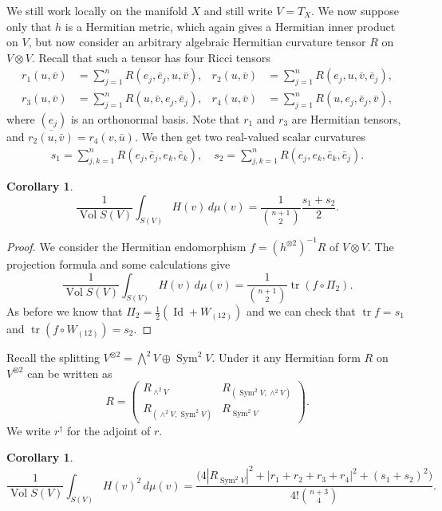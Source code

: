 \documentclass[10pt,a4paper]{amsart}
\newtheorem{coro}[theo]{Corollary}
\theoremstyle{definition}
\def\ov#1{\overline{#1}}
\def\d{\,d}
\DeclareMathOperator{\Sym}{Sym}
\DeclareMathOperator{\id}{Id}
\DeclareMathOperator{\tr}{tr}
\DeclareMathOperator{\Vol}{Vol}
\begin{document}
We still work locally on the manifold $X$ and still write $V = T_X$.
We now suppose only that $h$ is a Hermitian metric, which again gives a
Hermitian inner product on $V$, but now consider an arbitrary algebraic
Hermitian curvature tensor $R$ on $V \otimes V$.
Recall that such a tensor has four Ricci tensors
\begin{align*}
r_1(u, \bar v) &= \sum_{j=1}^n R(e_j, \bar e_j, u, \bar v),
	       &
r_2(u, \bar v) &= \sum_{j=1}^n R(e_j, u, \bar v, \bar e_j),
\\
r_3(u, \bar v) &= \sum_{j=1}^n R(u, \bar v, e_j, \bar e_j),
	       &
r_4(u, \bar v) &= \sum_{j=1}^n R(u, e_j, \bar e_j, \bar v),
\end{align*}
where $(e_j)$ is an orthonormal basis.
Note that $r_1$ and $r_3$ are Hermitian tensors, and
$\ov{r_2(u, \bar v)} = r_4(v, \bar u)$.
We then get two real-valued scalar curvatures
\begin{align*}
s_1 = \sum_{j,k=1}^n R(e_j, \bar e_j, e_k, \bar e_k),
\quad
s_2 = \sum_{j,k=1}^n R(e_j, e_k, \bar e_k, \bar e_j).
\end{align*}

\begin{coro}
$$
\frac{1}{\Vol S(V)} \int_{S(V)}
\!\!\!
H(v)  \d\mu(v)
= \frac{1}{\binom{n+1}{2}} \frac{s_1 + s_2}{2} .
$$
\end{coro}


\begin{proof}
We consider the Hermitian endomorphism $f = (h^{\otimes 2})^{-1} R$ of $V
\otimes V$.
The projection formula and some calculations give
$$
\frac{1}{\Vol S(V)} \int_{S(V)}
\!\!\!
H(v)  \d\mu(v)
= \frac{1}{\binom{n+1}{2}} \tr(f \circ \Pi_2).
$$
As before we know that $\Pi_2 = \frac12(\id + W_{(12)})$
and we can check that $\tr f = s_1$ and $\tr(f \circ W_{(12)}) = s_2$.
\end{proof}

Recall the splitting $V^{\otimes 2} = \bigwedge^2 V \oplus \Sym^2 V$.
Under it any Hermitian form $R$ on $V^{\otimes 2}$ can be written as
$$
R = \begin{pmatrix}
R_{\wedge^2 V} & R_{(\Sym^2V, \wedge^2 V)}
\\
R_{(\wedge^2 V, \Sym^2V)} & R_{\Sym^2 V}
\end{pmatrix}.
$$
We write $r^\dagger$ for the adjoint of $r$.

\begin{coro}
$$
\frac{1}{\Vol S(V)} \int_{S(V)}
\!\!\!
H(v)^2  \d\mu(v)
= \frac{
\bigl(
4 |R_{\Sym^2 V}|^2
+ |r_1 + r_2 + r_3 + r_4|^2
+ (s_1 + s_2)^2
\bigr)
}{4! \binom{n+3}{4}}.
$$
\end{coro}
\end{document}
